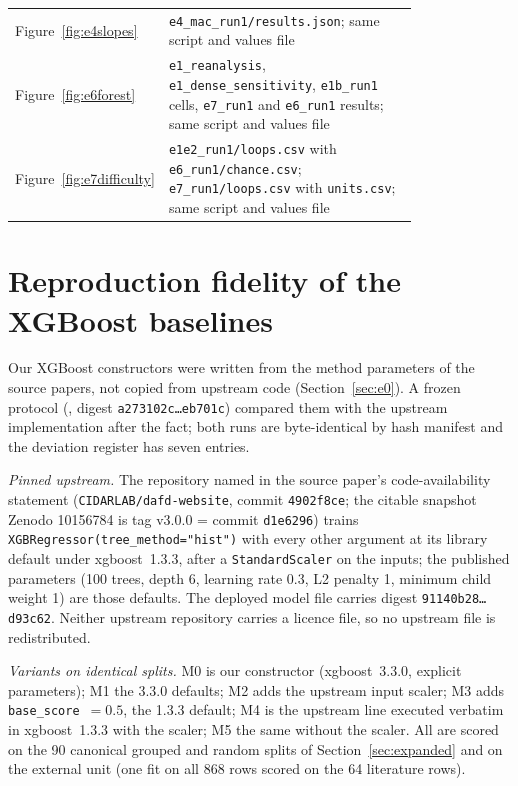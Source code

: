 \documentclass[11pt,a4paper]{article}
\newcommand{\hashtrunc}[2]{\texttt{#1\ldots#2}}
\begin{document}
{\begin{longtable}{lp{0.80\linewidth}}
Figure~\ref{fig:e4slopes} & \texttt{e4\_\allowbreak mac\_\allowbreak run1/\allowbreak results.json}; same script and values file \\
Figure~\ref{fig:e6forest} & \texttt{e1\_\allowbreak reanalysis}, \texttt{e1\_\allowbreak dense\_\allowbreak sensitivity}, \texttt{e1b\_\allowbreak run1} cells, \texttt{e7\_\allowbreak run1} and \texttt{e6\_\allowbreak run1} results; same script and values file \\
Figure~\ref{fig:e7difficulty} & \texttt{e1e2\_\allowbreak run1/\allowbreak loops.csv} with \texttt{e6\_\allowbreak run1/\allowbreak chance.csv}; \texttt{e7\_\allowbreak run1/\allowbreak loops.csv} with \texttt{units.csv}; same script and values file \\
\bottomrule
\end{longtable}
}
\addtocounter{table}{-1}

\section{Reproduction fidelity of the XGBoost baselines}
\label{app:fidelity}
Our XGBoost constructors were written from the method parameters of the
source papers, not copied from upstream code (Section~\ref{sec:e0}). A
frozen protocol (, digest
\hashtrunc{a273102c}{eb701c}) compared them with the upstream implementation
after the fact; both runs are byte-identical by hash manifest and the
deviation register has seven entries.

\emph{Pinned upstream.} The repository named in the source paper's
code-availability statement (\texttt{CIDARLAB/dafd-website}, commit
\texttt{4902f8ce}; the citable snapshot Zenodo 10156784 is tag v3.0.0 =
commit \texttt{d1e6296}) trains \texttt{XGBRegressor(tree\_method="hist")}
with every other argument at its library default under xgboost~1.3.3, after
a \texttt{StandardScaler} on the inputs; the published parameters (100 trees,
depth 6, learning rate 0.3, L2 penalty 1, minimum child weight 1) are those
defaults. The deployed model file carries digest \hashtrunc{91140b28}{d93c62}.
Neither upstream repository carries a licence file, so no upstream file is
redistributed.

\emph{Variants on identical splits.} M0 is our constructor (xgboost~3.3.0,
explicit parameters); M1 the 3.3.0 defaults; M2 adds the upstream input
scaler; M3 adds \texttt{base\_score}~$=0.5$, the 1.3.3 default; M4 is the
upstream line executed verbatim in xgboost~1.3.3 with the scaler; M5 the
same without the scaler. All are scored on the 90 canonical grouped and
random splits of Section~\ref{sec:expanded} and on the external unit (one
fit on all 868 rows scored on the 64 literature rows).
\end{document}
